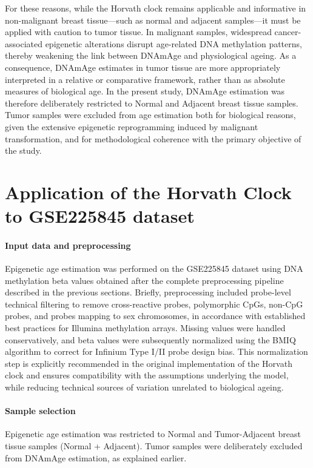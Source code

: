 \documentclass[10pt]{extarticle}
\begin{document}
For these reasons, while the Horvath clock remains applicable and informative in non-malignant breast tissue—such as normal and adjacent samples—it must be applied with caution to tumor tissue. In malignant samples, widespread cancer-associated epigenetic alterations disrupt age-related DNA methylation patterns, thereby weakening the link between DNAmAge and physiological ageing. As a consequence, DNAmAge estimates in tumor tissue are more appropriately interpreted in a relative or comparative framework, rather than as absolute measures of biological age.
In the present study, DNAmAge estimation was therefore deliberately restricted to Normal and Adjacent breast tissue samples. Tumor samples were excluded from age estimation both for biological reasons, given the extensive epigenetic reprogramming induced by malignant transformation, and for methodological coherence with the primary objective of the study. 

\section{Application of the Horvath Clock to GSE225845 dataset}

\paragraph{Input data and preprocessing}
Epigenetic age estimation was performed on the GSE225845 dataset using DNA methylation beta values obtained after the complete preprocessing pipeline described in the previous sections. Briefly, preprocessing included probe-level technical filtering to remove cross-reactive probes, polymorphic CpGs, non-CpG probes, and probes mapping to sex chromosomes, in accordance with established best practices for Illumina methylation arrays. Missing values were handled conservatively, and beta values were subsequently normalized using the BMIQ algorithm to correct for Infinium Type I/II probe design bias. This normalization step is explicitly recommended in the original implementation of the Horvath clock and ensures compatibility with the assumptions underlying the model, while reducing technical sources of variation unrelated to biological ageing.

\paragraph{Sample selection}
Epigenetic age estimation was restricted to Normal and Tumor-Adjacent breast tissue samples (Normal + Adjacent). Tumor samples were deliberately excluded from DNAmAge estimation, as explained earlier. 
\end{document}
